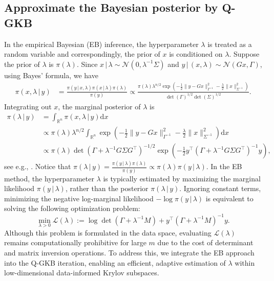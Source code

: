 \documentclass[]{myarticle}
\begin{document}
\subsection{Approximate the Bayesian posterior by Q-GKB}
In the empirical Bayesian (EB) inference, the hyperparameter $\lambda$ is treated as a random variable and correspondingly, the prior of $x$ is conditioned on $\lambda$. Suppose the prior of $\lambda$ is $\pi(\lambda)$. Since $x\,|\,\lambda\sim\mathcal{N}(0,\lambda^{-1}\Sigma)$ and $y\,|\,(x,\lambda)\sim\mathcal{N}(Gx,\Gamma)$, using Bayes' formula, we have 
\begin{align*}
  \pi(x,\lambda\,|\,y) 
  &= \frac{\pi(y\,|\,x,\lambda)\pi(x\,|\,\lambda)\pi(\lambda)}{\pi(y)} 
  \propto \frac{\pi(\lambda)\lambda^{n/2}\exp\left(-\frac{1}{2}\|y-Gx\|_{\Gamma^{-1}}^2-\frac{\lambda}{2}\|x\|_{\Sigma^{-1}}^2 \right)}{\det(\Gamma)^{1/2}\det(\Sigma)^{1/2}} .
\end{align*}
Integrating out $x$, the marginal posterior of $\lambda$ is
\begin{align*}
  \pi(\lambda\,|\,y) 
  &= \int_{\mathbb{R}^{n}} \pi(x,\lambda\,|\,y)\mathrm{d}x \\
  &\propto \pi(\lambda)\lambda^{n/2} \int_{\mathbb{R}^{n}} \exp\left(-\frac{1}{2}\|y-Gx\|_{\Gamma^{-1}}^2-\frac{\lambda}{2}\|x\|_{\Sigma^{-1}}^2 \right)\mathrm{d}x \\
  &\propto \pi(\lambda)\det(\Gamma+\lambda^{-1}G\Sigma G^{\top})^{-1/2}\exp\left(-\frac{1}{2}y^{\top}(\Gamma+\lambda^{-1}G\Sigma G^{\top})^{-1}y \right) ,
\end{align*}
see e.g., \cite{franklin1970well,lehtinen1989linear}.
Notice that $\pi(\lambda\,|\,y) = \frac{\pi(y\,|\,\lambda)\pi(\lambda)}{\pi(y)} \propto \pi(\lambda)\pi(y\,|\,\lambda)$. In the EB method, the hyperparameter $\lambda$ is typically estimated by maximizing the marginal likelihood $\pi(y\,|\,\lambda)$, rather than the posterior $\pi(\lambda\,|\,y)$. Ignoring constant terms, minimizing the negative log-marginal likelihood $-\log \pi(y\,|\,\lambda)$ is equivalent to solving the following optimization problem:
\begin{equation*}
  \min_{\lambda>0}\mathcal{L}(\lambda) 
  := \log \det(\Gamma+\lambda^{-1}M) + y^{\top}(\Gamma+\lambda^{-1}M)^{-1}y.
\end{equation*}
Although this problem is formulated in the data space, evaluating $\mathcal{L}(\lambda)$ remains computationally prohibitive for large $m$ due to the cost of determinant and matrix inversion operations. To address this, we integrate the EB approach into the Q-GKB iteration, enabling an efficient, adaptive estimation of $\lambda$ within low-dimensional data-informed Krylov subspaces.
\end{document}
